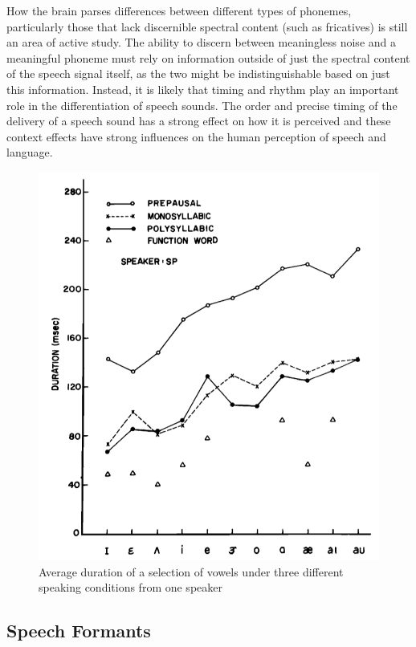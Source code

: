 \documentclass[titlepage]{article}
\begin{document}
    How the brain parses differences between different types of phonemes, particularly
    those that lack discernible spectral content (such as fricatives) is still an area
    of active study. The ability to discern between meaningless noise and a meaningful
    phoneme must rely on information outside of just the spectral content of the
    speech signal itself, as the two might be indistinguishable based on just this information.
    Instead, it is likely that timing and rhythm play an important role in the differentiation
    of speech sounds. The order and precise timing of the delivery of a speech sound has a
    strong effect on how it is perceived and these context effects have strong influences on
    the human perception of speech and language.


    \begin{figure}
      \centering
      \includegraphics[scale=0.3]{vowelDuration}
      \caption{Average duration of a selection of vowels under three different
      speaking conditions from one speaker \cite{Umeda1975}}
      \label{vowelDuration}
    \end{figure}

  \subsection{Speech Formants}
\end{document}
